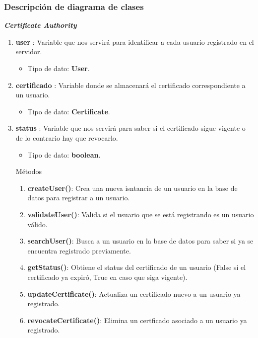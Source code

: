\documentclass[12pt, a4paper, titlepage]{report}
\begin{document}
			    \subsubsection{Descripción de diagrama de clases}
			    \textbf{\textit{Certificate Authority}}
			    \begin{enumerate}
    		        \item \textbf{user} : Variable que nos servirá para identificar a cada usuario registrado en el servidor.
    		        \begin{itemize}
    		            \item Tipo de dato: \textbf{User}.
    		        \end{itemize}
    		        
    		        \item \textbf{certificado} : Variable donde se almacenará el certificado correspondiente a un usuario.
    		        \begin{itemize}
    		            \item Tipo de dato: \textbf{Certificate}.
    		        \end{itemize}
    		        
    		        \item \textbf{status} : Variable que nos servirá para saber si el certificado sigue vigente o de lo contrario hay que revocarlo.
    		        \begin{itemize}
    		            \item Tipo de dato: \textbf{boolean}.
    		        \end{itemize}

    		        Métodos
    		        \begin{enumerate}
    		            \item \textbf{createUser()}: Crea una nueva isntancia de un usuario en la base de datos para registrar a un usuario.
    		            
    		            \item \textbf{validateUser()}: Valida si el usuario que se está registrando es un usuario válido.
    		            
    		            \item \textbf{searchUser()}: Busca a un usuario en la base de datos para saber si ya se encuentra registrado previamente.
    		            
    		            \item \textbf{getStatus()}: Obtiene el status del certificado de un usuario (False si el certificado ya expiró, True en caso que siga vigente).
    		            
    		            \item \textbf{updateCertificate()}: Actualiza un certificado nuevo a un usuario ya registrado.
    		            
    		            \item \textbf{revocateCertificate()}: Elimina un certficado asociado a un usuario ya registrado.
    		            
    		        \end{enumerate}
			    \end{enumerate}
			    
\end{document}
